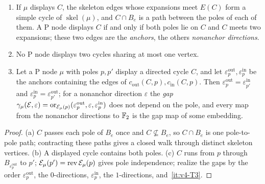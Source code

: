\begin{lemma}[display]\label{lem:v4-display}
\begin{enumerate}[label=(\alph*),nosep]
\item If $\mu$ displays $C$, the skeleton edges whose expansions meet $E(C)$
form a simple cycle of $\operatorname{skel}(\mu)$, and $C\cap B_e$ is a path
between the poles of each of them. A P node displays $C$ if and only if both
poles lie on $C$ and $C$ meets two expansions; these two edges are the
\emph{anchors}, the others \emph{nonanchor directions}.
\item No P node displays two cycles sharing at most one vertex.
\item Let a P node $\mu$ with poles $p,p'$ display a directed cycle $C$, and
let $\varepsilon^{\mathrm{out}}_p,\varepsilon^{\mathrm{in}}_p$ be the anchors
containing the edges of $c_{\mathrm{out}}(C,p),c_{\mathrm{in}}(C,p)$. Then
$\varepsilon^{\mathrm{out}}_p=\varepsilon^{\mathrm{in}}_{p'}$ and
$\varepsilon^{\mathrm{in}}_p=\varepsilon^{\mathrm{out}}_{p'}$; for a nonanchor
direction $\varepsilon$ the \emph{gap}
$\gamma_\mu(\mathcal E,\varepsilon)=\operatorname{or}_{\mathcal E_\mu(p)}
(\varepsilon^{\mathrm{out}}_p,\varepsilon,\varepsilon^{\mathrm{in}}_p)$ does
not depend on the pole, and every map from the nonanchor directions to
$\mathbb F_2$ is the gap map of some embedding.
\end{enumerate}
\end{lemma}

\begin{proof}
(a) $C$ passes each pole of $B_e$ once and $C\not\subseteq B_e$, so $C\cap
B_e$ is one pole-to-pole path; contracting these paths gives a closed walk
through distinct skeleton vertices. (b) A displayed cycle contains both
poles. (c) $C$ runs from $p$ through $B_{\varepsilon^{\mathrm{out}}_p}$ to
$p'$; $\mathcal E_\mu(p')=\operatorname{rev}\mathcal E_\mu(p)$ gives pole independence;
realize the gaps by the order $\varepsilon^{\mathrm{out}}_p$, the
$0$-directions, $\varepsilon^{\mathrm{in}}_p$, the $1$-directions,
and~\ref{it:v4-T3}.
\end{proof}

